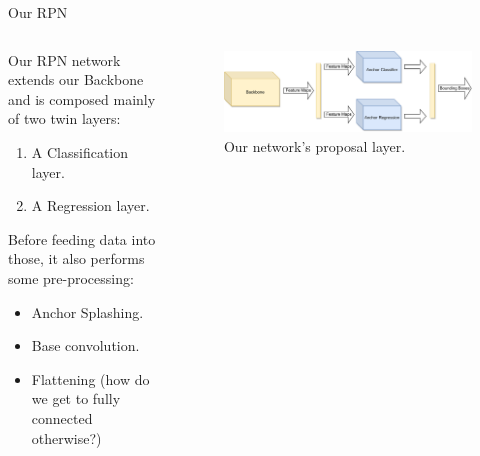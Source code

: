 \documentclass[english]{beamer}
\begin{document}
\begin{frame}{Our RPN}
  \begin{columns}
    
    \begin{column}{0.5\textwidth}
      Our RPN network extends our Backbone and is composed mainly of two twin layers:
      \begin{enumerate}
        \item A Classification layer.
        \item A Regression layer.
      \end{enumerate}
      Before feeding data into those, it also performs some pre-processing:
      \begin{itemize}
        \item Anchor Splashing.
        \item Base convolution.
        \item Flattening (how do we get to fully connected otherwise?)
      \end{itemize}
    \end{column}

    \begin{column}{0.5\textwidth}
      \begin{figure}
        \centering
            \includegraphics[width=1.0\textwidth]{images/network.pdf}
            \caption{Our network's proposal layer.}
        \end{figure}
    \end{column}

  \end{columns}
\end{frame}
\end{document}
